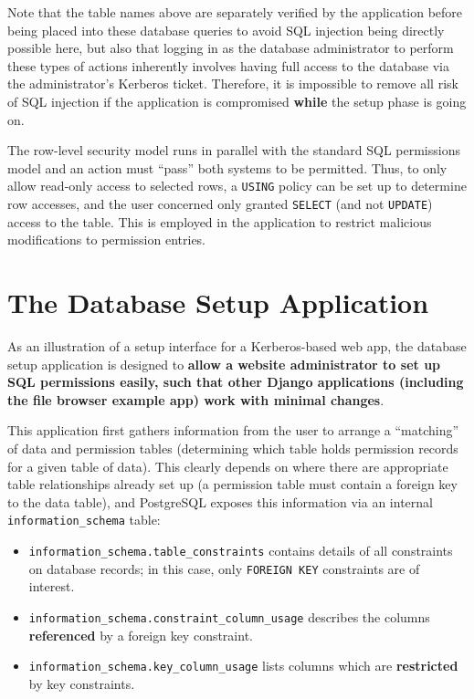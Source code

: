 \documentclass[12pt]{report}
\begin{document}
Note that the table names above are separately verified by the application before being placed into these database queries to avoid SQL injection being directly possible here, but also that logging in as the database administrator to perform these types of actions inherently involves having full access to the database via the administrator's Kerberos ticket. Therefore, it is impossible to remove all risk of SQL injection if the application is compromised \textbf{while} the setup phase is going on.

The row-level security model runs in parallel with the standard SQL permissions model and an action must ``pass'' both systems to be permitted. Thus, to only allow read-only access to selected rows, a \texttt{USING} policy can be set up to determine row accesses, and the user concerned only granted \texttt{SELECT} (and not \texttt{UPDATE}) access to the table. This is employed in the application to restrict malicious modifications to permission entries.

\section{The Database Setup Application}
\label{sec:database_setup_application}
As an illustration of a setup interface for a Kerberos-based web app, the database setup application is designed to \textbf{allow a website administrator to set up SQL permissions easily, such that other Django applications (including the file browser example app) work with minimal changes}.

This application first gathers information from the user to arrange a ``matching'' of data and permission tables (determining which table holds permission records for a given table of data). This clearly depends on where there are appropriate table relationships already set up (a permission table must contain a foreign key to the data table), and PostgreSQL exposes this information via an internal \verb+information_schema+ table\cite{postgres-info_schema}:

\begin{itemize}
\item
  \verb+information_schema.table_constraints+ contains details of all constraints on database records; in this case, only \texttt{FOREIGN KEY} constraints are of interest.
\item
  \verb+information_schema.constraint_column_usage+ describes the columns \textbf{referenced} by a foreign key constraint.
\item
  \verb+information_schema.key_column_usage+ lists columns which are \textbf{restricted} by key constraints.
\end{itemize}
\end{document}
